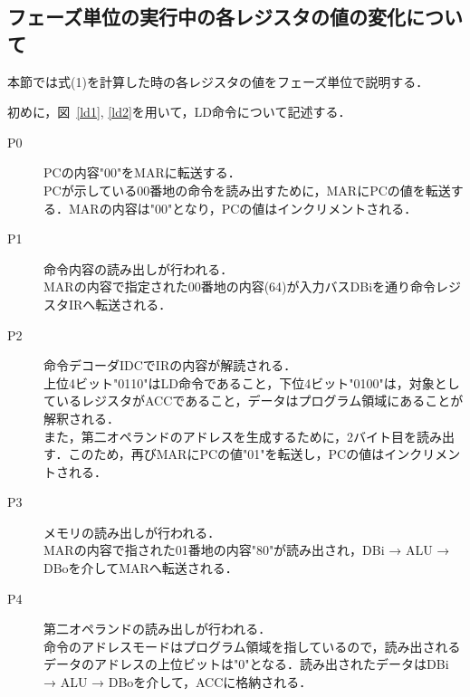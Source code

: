 \documentclass[dvipdfmx]{jsarticle}
\begin{document}
\subsection{フェーズ単位の実行中の各レジスタの値の変化について}
本節では式(1)を計算した時の各レジスタの値をフェーズ単位で説明する．

初めに，図~\ref{ld1}, \ref{ld2}を用いて，LD命令について記述する．
\begin{description}
    \item[P0] PCの内容"00"をMARに転送する． \\ PCが示している00番地の命令を読み出すために，MARにPCの値を転送する．MARの内容は"00"となり，PCの値はインクリメントされる．
    \vspace{2mm}
    \item[P1] 命令内容の読み出しが行われる．\\ MARの内容で指定された00番地の内容(64)が入力バスDBiを通り命令レジスタIRへ転送される．  
    \vspace{2mm}
    \item[P2] 命令デコーダIDCでIRの内容が解読される． \\ 上位4ビット"0110"はLD命令であること，下位4ビット"0100"は，対象としているレジスタがACCであること，データはプログラム領域にあることが解釈される． \\ 
    また，第二オペランドのアドレスを生成するために，2バイト目を読み出す．このため，再びMARにPCの値"01"を転送し，PCの値はインクリメントされる．
    \vspace{2mm}
    \item[P3] メモリの読み出しが行われる． \\ MARの内容で指された01番地の内容"80"が読み出され，DBi → ALU → DBoを介してMARへ転送される．
    \vspace{2mm}
    \item[P4] 第二オペランドの読み出しが行われる． \\   命令のアドレスモードはプログラム領域を指しているので，読み出されるデータのアドレスの上位ビットは"0"となる．読み出されたデータはDBi → ALU → DBoを介して，ACCに格納される．
\end{description}
\end{document}
